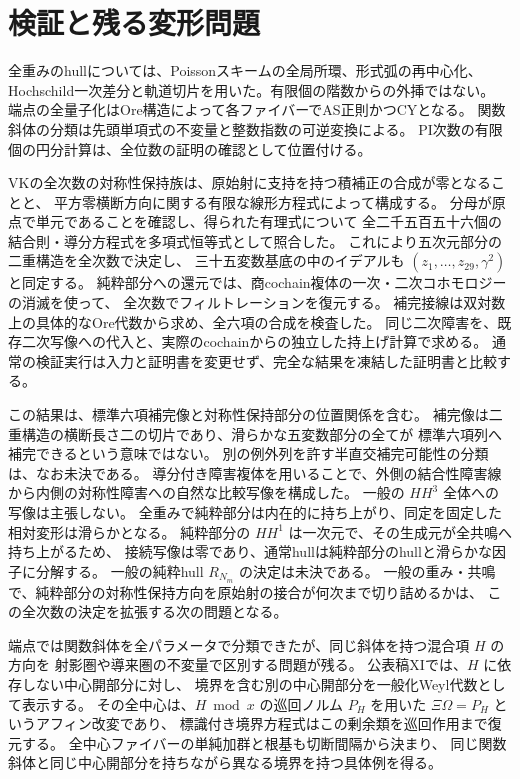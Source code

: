 \section{検証と残る変形問題}

全重みのhullについては、Poissonスキームの全局所環、形式弧の再中心化、
Hochschild一次差分と軌道切片を用いた。有限個の階数からの外挿ではない。
端点の全量子化はOre構造によって各ファイバーでAS正則かつCYとなる。
関数斜体の分類は先頭単項式の不変量と整数指数の可逆変換による。
PI次数の有限個の円分計算は、全位数の証明の確認として位置付ける。

VKの全次数の対称性保持族は、原始射に支持を持つ積補正の合成が零となることと、
平方零横断方向に関する有限な線形方程式によって構成する。
分母が原点で単元であることを確認し、得られた有理式について
全二千五百五十六個の結合則・導分方程式を多項式恒等式として照合した。
これにより五次元部分の二重構造を全次数で決定し、
三十五変数基底の中のイデアルも $(z_1,\ldots,z_{29},\gamma^2)$ と同定する。
純粋部分への還元では、商cochain複体の一次・二次コホモロジーの消滅を使って、
全次数でフィルトレーションを復元する。
補完接線は双対数上の具体的なOre代数から求め、全六項の合成を検査した。
同じ二次障害を、既存二次写像への代入と、実際のcochainからの独立した持上げ計算で求める。
通常の検証実行は入力と証明書を変更せず、完全な結果を凍結した証明書と比較する。

この結果は、標準六項補完像と対称性保持部分の位置関係を含む。
補完像は二重構造の横断長さ二の切片であり、滑らかな五変数部分の全てが
標準六項列へ補完できるという意味ではない。
別の例外列を許す半直交補完可能性の分類は、なお未決である。
導分付き障害複体を用いることで、外側の結合性障害線から内側の対称性障害への自然な比較写像を構成した。
一般の $HH^3$ 全体への写像は主張しない。
全重みで純粋部分は内在的に持ち上がり、同定を固定した相対変形は滑らかとなる。
純粋部分の $HH^1$ は一次元で、その生成元が全共鳴へ持ち上がるため、
接続写像は零であり、通常hullは純粋部分のhullと滑らかな因子に分解する。
一般の純粋hull $R_{N_m}$ の決定は未決である。
一般の重み・共鳴で、純粋部分の対称性保持方向を原始射の接合が何次まで切り詰めるかは、
この全次数の決定を拡張する次の問題となる。

端点では関数斜体を全パラメータで分類できたが、同じ斜体を持つ混合項 $H$ の方向を
射影圏や導来圏の不変量で区別する問題が残る。
公表稿XI\cite{VKPrimitive36}では、$H$ に依存しない中心開部分に対し、
境界を含む別の中心開部分を一般化Weyl代数として表示する。
その全中心は、$H\bmod x$ の巡回ノルム $P_H$ を用いた
$\Xi\Omega=P_H$ というアフィン改変であり、
標識付き境界方程式はこの剰余類を巡回作用まで復元する。
全中心ファイバーの単純加群と根基も切断間隔から決まり、
同じ関数斜体と同じ中心開部分を持ちながら異なる境界を持つ具体例を得る。

